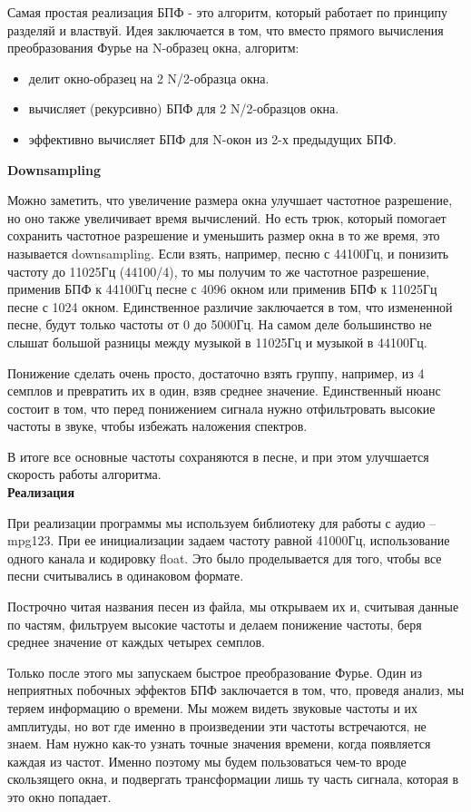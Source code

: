 Самая простая реализация БПФ - это алгоритм, который работает по принципу разделяй и властвуй. Идея заключается в том, что вместо прямого вычисления преобразования Фурье на N-образец окна, алгоритм:

\begin{itemize}
	\item делит окно-образец на 2 N/2-образца окна.
	\item вычисляет (рекурсивно) БПФ для 2 N/2-образцов окна.
	\item эффективно вычисляет БПФ для N-окон из 2-х предыдущих БПФ.
\end{itemize}

\noindent \textbf{Downsampling}

Можно заметить, что увеличение размера окна улучшает частотное разрешение, но оно также увеличивает время вычислений. Но есть трюк, который помогает сохранить частотное разрешение и уменьшить размер окна в то же время, это называется downsampling. Если взять, например, песню с 44100Гц, и понизить частоту до 11025Гц (44100/4), то мы получим то же частотное разрешение, применив БПФ к 44100Гц песне с 4096 окном или применив БПФ к 11025Гц песне с 1024 окном. Единственное различие заключается в том, что измененной песне, будут только частоты от 0 до 5000Гц. На самом деле большинство не слышат большой разницы между музыкой в 11025Гц и музыкой в 44100Гц. 

Понижение сделать очень просто, достаточно взять группу, например, из 4 семплов и превратить их в один, взяв среднее значение. Единственный нюанс состоит в том, что перед понижением сигнала нужно отфильтровать высокие частоты в звуке, чтобы избежать наложения спектров.

В итоге все основные частоты сохраняются в песне, и при этом улучшается скорость работы алгоритма.\\

\noindent \textbf{Реализация}

При реализации программы мы используем библиотеку для работы с аудио -- mpg123. При ее инициализации задаем частоту равной 41000Гц, использование одного канала и кодировку float. Это было проделывается для того, чтобы все песни считывались в одинаковом формате.

Построчно читая названия песен из файла, мы открываем их и, считывая данные по частям, фильтруем высокие частоты и делаем понижение частоты, беря среднее значение от каждых четырех семплов.

Только после этого мы запускаем быстрое преобразование Фурье. Один из неприятных побочных эффектов БПФ заключается в том, что, проведя анализ, мы теряем информацию о времени.  Мы можем видеть звуковые частоты и их амплитуды, но вот где именно в произведении эти частоты встречаются, не знаем. Нам нужно как-то узнать точные значения времени, когда появляется каждая из частот. Именно поэтому мы будем пользоваться чем-то вроде скользящего окна, и подвергать трансформации лишь ту часть сигнала, которая в это окно попадает.

